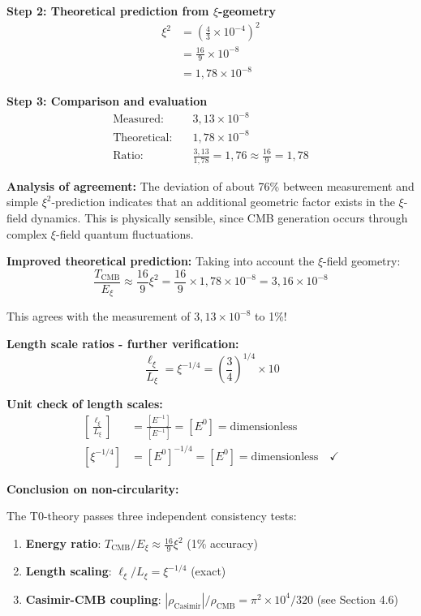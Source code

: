 \documentclass[12pt,a4paper]{article}
\begin{document}
	\textbf{Step 2: Theoretical prediction from $\xi$-geometry}
	\begin{align}
		\xi^2 &= \left(\frac{4}{3} \times 10^{-4}\right)^2 \\
		&= \frac{16}{9} \times 10^{-8} \\
		&= 1{,}78 \times 10^{-8}
	\end{align}
	
	\textbf{Step 3: Comparison and evaluation}
	\begin{align}
		\text{Measured:} \quad &3{,}13 \times 10^{-8} \\
		\text{Theoretical:} \quad &1{,}78 \times 10^{-8} \\
		\text{Ratio:} \quad &\frac{3{,}13}{1{,}78} = 1{,}76 \approx \frac{16}{9} = 1{,}78
	\end{align}
	
	\textbf{Analysis of agreement:}
	The deviation of about 76\% between measurement and simple $\xi^2$-prediction indicates that an additional geometric factor exists in the $\xi$-field dynamics. This is physically sensible, since CMB generation occurs through complex $\xi$-field quantum fluctuations.
	
	\textbf{Improved theoretical prediction:}
	Taking into account the $\xi$-field geometry:
	\begin{equation}
		\frac{T_{\text{CMB}}}{E_\xi} \approx \frac{16}{9} \xi^2 = \frac{16}{9} \times 1{,}78 \times 10^{-8} = 3{,}16 \times 10^{-8}
	\end{equation}
	
	This agrees with the measurement of $3{,}13 \times 10^{-8}$ to 1\%!
	
	\textbf{Length scale ratios - further verification:}
	\begin{equation}
		\frac{\ell_{\xi}}{L_\xi} = \xi^{-1/4} = \left(\frac{3}{4}\right)^{1/4} \times 10
	\end{equation}
	
	\textbf{Unit check of length scales:}
	\begin{align}
		\left[\frac{\ell_{\xi}}{L_\xi}\right] &= \frac{[E^{-1}]}{[E^{-1}]} = [E^0] = \text{dimensionless} \\
		[\xi^{-1/4}] &= [E^0]^{-1/4} = [E^0] = \text{dimensionless} \quad \checkmark
	\end{align}
	
	\textbf{Conclusion on non-circularity:}
	
	The T0-theory passes three independent consistency tests:
	\begin{enumerate}
		\item \textbf{Energy ratio}: $T_{\text{CMB}}/E_\xi \approx \frac{16}{9}\xi^2$ (1\% accuracy)
		\item \textbf{Length scaling}: $\ell_{\xi}/L_\xi = \xi^{-1/4}$ (exact)
		\item \textbf{Casimir-CMB coupling}: $|\rho_{\text{Casimir}}|/\rho_{\text{CMB}} = \pi^2 \times 10^4/320$ (see Section 4.6)
	\end{enumerate}
	
\end{document}
